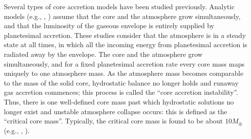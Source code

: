 \documentclass[apj]{emulateapj}
\begin{document}
Several types of core accretion models have been studied previously. Analytic models (e.g., \citealt{stevenson82}, \citealt{rafikov06}) assume that the core and the atmosphere grow simultaneously, and that the luminosity of the gaseous envelope is entirely supplied by planetesimal accretion. These studies consider that the atmosphere is in a steady state at all times, in which all the incoming energy from planetesimal accretion is radiated away by the envelope. The core and the atmosphere grow simultaneously, and for a fixed planetesimal accretion rate every core mass maps uniquely to one atmosphere mass. As the atmosphere mass becomes comparable to the mass of the solid core, hydrostatic balance no longer holds and runaway gas accretion commences; this process is called the ``core accretion instability''. Thus, there is one well-defined core mass past which hydrostatic solutions no longer exist and unstable atmosphere collapse occurs: this is defined as the ``critical core mass''.  Typically, the critical core mass is found to be about $10 M_{\oplus}$ (e.g., \citealt{stevenson82}, \citealt{rafikov06}). 



\end{document}
